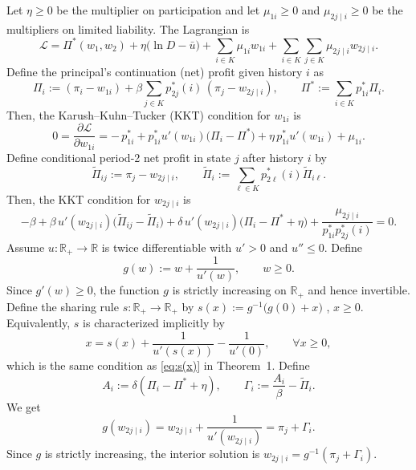\documentclass[12pt]{article}
\theoremstyle{definition}
\begin{document}
Let \(\eta\ge 0\) be the multiplier on participation and let \(\mu_{1i}\ge 0\) and
\(\mu_{2j\mid i}\ge 0\) be the multipliers on limited liability. The Lagrangian is
\[
\mathcal{L}
=
\Pi^*(w_1,w_2)
+\eta\big(\ln D-\bar u\big)
+\sum_{i\in K}\mu_{1i}w_{1i}
+\sum_{i\in K}\sum_{j\in K}\mu_{2j\mid i}w_{2j\mid i}.
\]
Define the principal's continuation (net) profit given history \(i\) as
\[
\Pi_i
:=
(\pi_i-w_{1i})
+\beta\sum_{j\in K}p_{2j}^*(i)\,(\pi_j-w_{2j\mid i}),
\qquad
\Pi^*:=\sum_{i\in K}p_{1i}^*\Pi_i.
\]
Then, the Karush--Kuhn--Tucker (KKT) condition for \(w_{1i}\) is
\begin{equation}\label{eq:kkt_1_app}
0
=
\frac{\partial \mathcal{L}}{\partial w_{1i}}
=
-\,p_{1i}^*
+
p_{1i}^*u'(w_{1i})\big(\Pi_i-\Pi^*\big)
+\eta\,p_{1i}^*u'(w_{1i})
+\mu_{1i}.
\end{equation}
Define conditional period-2 net profit in state \(j\) after history \(i\) by
\[
\tilde\Pi_{ij}:=\pi_j-w_{2j\mid i},
\qquad
\tilde\Pi_i:=\sum_{\ell\in K}p_{2\ell}^*(i)\tilde\Pi_{i\ell}.
\]
Then, the KKT condition for \(w_{2j\mid i}\) is
\begin{equation}\label{eq:kkt_2_app}
-\beta
+
\beta\,u'(w_{2j\mid i})\big(\tilde\Pi_{ij}-\tilde\Pi_i\big)
+
\delta\,u'(w_{2j\mid i})\big(\Pi_i-\Pi^*+\eta\big)
+
\frac{\mu_{2j\mid i}}{p_{1i}^*p_{2j}^*(i)}
=0.
\end{equation}
Assume \(u:\mathbb{R}_+\to\mathbb{R}\) is twice differentiable with \(u'>0\) and \(u''\le 0\).
Define
\begin{equation}\label{eq:g_def_general}
g(w):=w+\frac{1}{u'(w)},\qquad w\ge 0.
\end{equation}
Since $g'(w) \ge 0$, the function \(g\) is strictly increasing on \(\mathbb{R}_+\) and hence invertible. Define the sharing rule \(s:\mathbb{R}_+\to\mathbb{R}_+\) by $s(x):=g^{-1}\!\big(g(0)+x\big)$ , $x\ge 0.$
Equivalently, \(s\) is characterized implicitly by
\begin{equation}\label{eq:s_general_def_implicit}
x=s(x)+\frac{1}{u'(s(x))}-\frac{1}{u'(0)},\qquad \forall x\ge 0,
\end{equation}
which is the same condition as \eqref{eq:s(x)} in Theorem~1.
Define
\[
A_i:=\delta(\Pi_i-\Pi^*+\eta),
\qquad
\Gamma_i:=\frac{A_i}{\beta}-\tilde\Pi_i.
\]
We get
\begin{equation}\label{eq:period2_g_identity_general}
g(w_{2j\mid i})
=w_{2j\mid i}+\frac{1}{u'(w_{2j\mid i})}
=\pi_j+\Gamma_i.
\end{equation}
Since \(g\) is strictly increasing, the interior solution is \(w_{2j\mid i}=g^{-1}(\pi_j+\Gamma_i)\).
\end{document}
